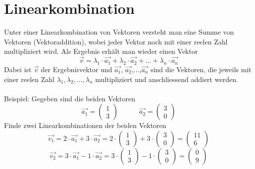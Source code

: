 \section{Linearkombination}
Unter einer Linearkombination von Vektoren versteht man eine Summe von Vektoren (Vektoraddition), wobei jeder Vektor noch mit einer reelen Zahl multipliziert wird. Als Ergebnis erhält man wieder einen Vektor
\begin{equation*}
\vec{v} = \lambda_1 \cdot \vec{a_1} + \lambda_2 \cdot \vec{a_2} + ... + \lambda_n \cdot \vec{a_n}
\end{equation*}
Dabei ist $\vec{v}$ der Ergebnisvektor und $\vec{a_1}$, $\vec{a_2}$,...,$\vec{a_n}$ sind die Vektoren, die jeweils mit einer reelen Zahl $\lambda_1, \lambda_2,...,\lambda_n$ multipliziert und anschliessend addiert werden.\\\\
Beispiel: Gegeben sind die beiden Vektoren
\begin{equation*}
\vec{a_1} = \begin{pmatrix}1\\3\end{pmatrix} \quad\quad\quad \vec{a_2} = \begin{pmatrix}3\\0\end{pmatrix}
\end{equation*}
Finde zwei Linearkombinationen der beiden Vektoren
\begin{equation*}
\vec{v_1} = 2\cdot \vec{a_1} + 3\cdot \vec{a_2}=2\cdot \begin{pmatrix}1\\3\end{pmatrix} + 3 \cdot \begin{pmatrix}3\\0\end{pmatrix} = \begin{pmatrix}11\\6\end{pmatrix}
\end{equation*}
\begin{equation*}
\vec{v_2} = 3\cdot \vec{a_1} - 1\cdot \vec{a_2}=3\cdot \begin{pmatrix}1\\3\end{pmatrix} - 1 \cdot \begin{pmatrix}3\\0\end{pmatrix} = \begin{pmatrix}0\\9\end{pmatrix}
\end{equation*}
